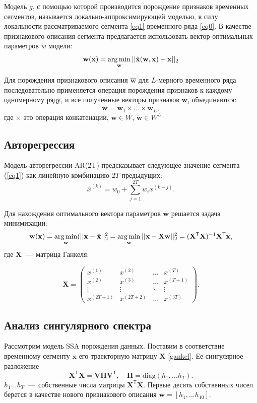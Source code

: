 \documentclass[12pt, twoside]{article}
\begin{document}
Модель $g$, с помощью которой производится порождение признаков временных сегментов, называется локально-аппроксимирующей моделью, в силу локальности рассматриваемого сегмента \ref{eq1} временного ряда \ref{eq0}. В качестве признакового описания сегмента предлагается использовать вектор оптимальных параметров $w$ модели: 
$$\mathbf{w}(\mathbf{x})=\argmin\limits_{\mathbf{w}}||\hat{\mathbf{x}}(\mathbf{w},\mathbf{x})-\mathbf{x}||_2$$

Для порождения признакового описания $\hat{\mathbf{w}}$ для $L$-мерного временного ряда последовательно применяется операция порождения признаков к каждому одномерному ряду, и все полученные векторы признаков $\mathbf{w}_l$ объединяются:
$$\widetilde{\mathbf{w}} = \mathbf{w}_1\times \ldots \times \mathbf{w}_L,$$
где $\times$ это операция конкатенации, $\mathbf{w}\in W$, $\widetilde{\mathbf{w}} \in W^L$


\subsection{Авторегрессия}
Модель авторегрессии AR($2$T) предсказывает следующее значение сегмента (\ref{eq1}) как линейную комбинацию $2T$ предыдущих:
$$\hat{x}^{(k)}=w_0+\sum\limits_{j=1}^{2T} w_i x^{(k-j)}.$$

Для нахождения оптимального вектора параметров $\mathbf{w}$ решается задача минимизации:
$$\mathbf{w}(\mathbf{x})=\argmin_{\mathbf{w}}(||\mathbf{x}-\hat{\mathbf{x}}||_2^2=\argmin_{\mathbf{w}}||\mathbf{x}-\mathbf{X}\mathbf{w}||_2^2=(\mathbf{X}^\mathsf{T}\mathbf{X})^{-1}\mathbf{X}^\mathsf{T}\mathbf{x},$$
где $\mathbf{X}$~---~матрица Ганкеля:

\begin{equation*}\label{gankel}
\mathbf{X} = \left(
\begin{array}{cccc}
x^{(1)} & x^{(2)} & \ldots & x^{(T)}\\
x^{(2)} & x^{(3)} & \ldots & x^{(T+1)}\\
\vdots & \vdots & \ddots & \vdots\\
x^{(2T+1)} & x^{(2T+2)} & \ldots & x^{(3T)}
\end{array}
\right).
\end{equation*}

\subsection{ Анализ сингулярного спектра}
Рассмотрим модель SSA порождения данных. Поставим в соответствие временному сегменту $\mathbf{x}$ его траекторную матрицу $\mathbf{X}$ \ref{gankel}. Ее сингулярное разложение 
$$\mathbf{X}^\mathsf{T}\mathbf{X}=\mathbf{V}\mathbf{H}\mathbf{V}^\mathsf{T},\quad \mathbf{H} = \text{diag}(h_1,\ldots h_T).$$ 
$h_1\ldots h_T$~---~собственные числа матрицы $\mathbf{X}^\mathsf{T}\mathbf{X}$. Первые десять собственных чисел берется в качестве нового признакового описания $\mathbf{w}=[h_1,\ldots h_{10}]$.  
\end{document}
